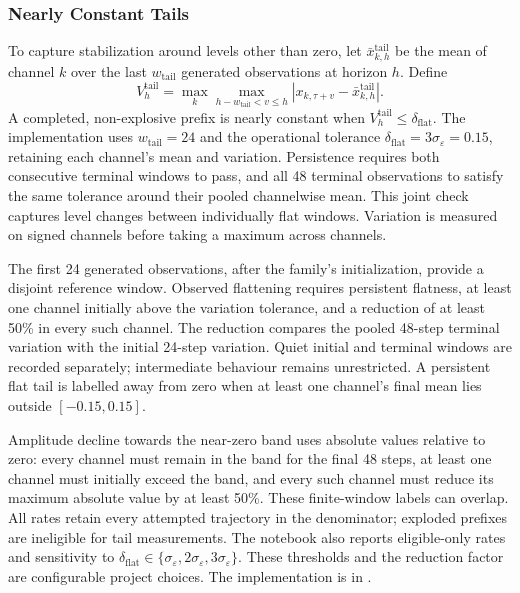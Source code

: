 \subsubsection{Nearly Constant Tails}
To capture stabilization around levels other than zero, let
$\bar x^{\mathrm{tail}}_{k,h}$ be the mean of channel $k$ over the last
$w_{\mathrm{tail}}$ generated observations at horizon $h$. Define
\begin{equation}
 V_h^{\mathrm{tail}}=
 \max_k\max_{h-w_{\mathrm{tail}}<v\leq h}
 \left|x_{k,\tau+v}-\bar x^{\mathrm{tail}}_{k,h}\right|.
 \label{eq:generator-flat-tail}
\end{equation}
A completed, non-explosive prefix is nearly constant when
$V_h^{\mathrm{tail}}\leq\delta_{\mathrm{flat}}$. The implementation uses
$w_{\mathrm{tail}}=24$ and the operational tolerance
$\delta_{\mathrm{flat}}=3\sigma_\varepsilon=0.15$, retaining each channel's
mean and variation. Persistence requires both consecutive terminal windows
to pass, and all 48 terminal observations to satisfy the same tolerance
around their pooled channelwise mean. This joint check captures level changes
between individually flat windows. Variation is measured on signed channels
before taking a maximum across channels.

The first 24 generated observations, after the family's initialization,
provide a disjoint reference window. Observed flattening requires persistent
flatness, at least one channel initially above the variation tolerance, and
a reduction of at least 50\% in every such channel. The reduction compares
the pooled 48-step terminal variation with the initial 24-step variation.
Quiet initial and terminal windows are recorded separately; intermediate
behaviour remains unrestricted. A persistent flat tail is labelled away
from zero when at least one channel's final mean lies outside $[-0.15,0.15]$.

Amplitude decline towards the near-zero band uses absolute values relative
to zero: every channel must remain in the band for the final 48 steps,
at least one channel must initially exceed the band, and every such channel
must reduce its maximum absolute value by at least 50\%. These finite-window
labels can overlap. All rates retain every attempted trajectory in the
denominator; exploded prefixes are ineligible for tail measurements.
The notebook also reports eligible-only rates and sensitivity to
$\delta_{\mathrm{flat}}\in\{\sigma_\varepsilon,2\sigma_\varepsilon,
3\sigma_\varepsilon\}$. These thresholds and the reduction factor are
configurable project choices. The implementation is in
.
